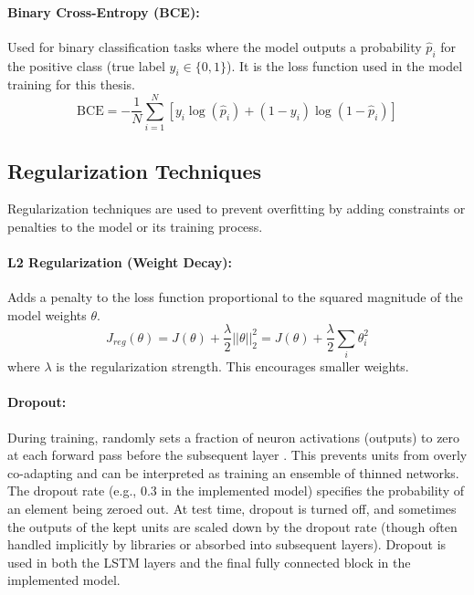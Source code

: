 \paragraph{Binary Cross-Entropy (BCE):}
\label{eq:bce} %
Used for binary classification tasks where the model outputs a probability \( \hat{p}_i \) for the positive class (true label \( y_i \in \{0, 1\} \)). It is the loss function used in the model training for this thesis.
\begin{equation}
  \text{BCE} = -\frac{1}{N} \sum_{i=1}^N [ y_i \log(\hat{p}_i) + (1 - y_i) \log(1 - \hat{p}_i) ]
\end{equation}


\subsection{Regularization Techniques}
Regularization techniques are used to prevent overfitting by adding constraints or penalties to the model or its training process.

\paragraph{L2 Regularization (Weight Decay):}
Adds a penalty to the loss function proportional to the squared magnitude of the model weights \( \theta \).
\begin{equation}
  J_{reg}(\theta) = J(\theta) + \frac{\lambda}{2} ||\theta||_2^2 = J(\theta) + \frac{\lambda}{2} \sum_i \theta_i^2
\end{equation}
where \( \lambda \) is the regularization strength. This encourages smaller weights.

\paragraph{Dropout:}
During training, randomly sets a fraction of neuron activations (outputs) to zero at each forward pass before the subsequent layer \autocite{srivastava2014dropout}. This prevents units from overly co-adapting and can be interpreted as training an ensemble of thinned networks. The dropout rate (e.g., 0.3 in the implemented model) specifies the probability of an element being zeroed out. At test time, dropout is turned off, and sometimes the outputs of the kept units are scaled down by the dropout rate (though often handled implicitly by libraries or absorbed into subsequent layers). Dropout is used in both the LSTM layers and the final fully connected block in the implemented model.

